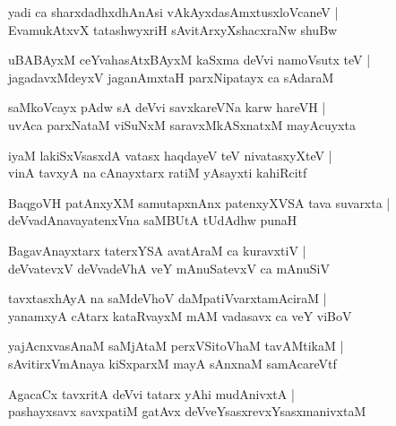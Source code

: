 \begin{shloka}
yadi ca sharxdadhxdhAnAsi vAkAyxdasAmxtusxloVcaneV |\\
EvamukAtxvX tatashwyxriH sAvitArxyXshacxraNw shuBw
\end{shloka}

\begin{shloka}
uBABAyxM ceYvahasAtxBAyxM kaSxma deVvi namoVsutx teV |\\
jagadavxMdeyxV jaganAmxtaH parxNipatayx ca sAdaraM 
\end{shloka}

\begin{shloka}
saMkoVcayx pAdw sA deVvi savxkareVNa karw hareVH |\\
uvAca parxNataM viSuNxM saravxMkASxnatxM mayAcuyxta
\end{shloka}

\begin{shloka}
iyaM lakiSxVsasxdA vatasx haqdayeV teV nivatasxyXteV |\\
vinA tavxyA na cAnayxtarx ratiM yAsayxti kahiRcitf
\end{shloka}

\begin{shloka}
BaqgoVH patAnxyXM samutapxnAnx patenxyXVSA tava suvarxta |\\
deVvadAnavayatenxVna saMBUtA tUdAdhw punaH 
\end{shloka}

\begin{shloka}
BagavAnayxtarx taterxYSA avatAraM ca kuravxtiV |\\
deVvatevxV deVvadeVhA veY mAnuSatevxV ca mAnuSiV 
\end{shloka}

\begin{shloka}
tavxtasxhAyA na saMdeVhoV daMpatiVvarxtamAciraM |\\
yanamxyA cAtarx kataRvayxM mAM vadasavx ca veY viBoV
\end{shloka}

\begin{shloka}
yajAcnxvasAnaM saMjAtaM perxVSitoVhaM tavAMtikaM |\\
sAvitirxVmAnaya kiSxparxM mayA sAnxnaM samAcareVtf
\end{shloka}

\begin{shloka}
AgacaCx tavxritA deVvi tatarx yAhi mudAnivxtA |\\
pashayxsavx savxpatiM gatAvx deVveYsasxrevxYsasxmanivxtaM 
\end{shloka}

